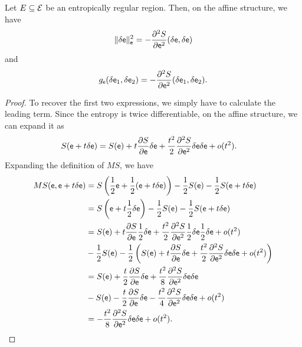\begin{mathSection}
\begin{thrm}
	Let $E \subseteq \mathcal{E}$ be an entropically regular region. Then, on the affine structure, we have
	$$ \lVert \delta \mathsf{e} \rVert_{\mathsf{e}}^2 = - \frac{\partial^2 S}{\partial \mathsf{e}^2}(\delta \mathsf{e} , \delta \mathsf{e}) $$
	and 
	$$ g_{\mathsf{e}}( \delta \mathsf{e}_1, \delta \mathsf{e}_2 ) = - \frac{\partial^2 S}{\partial \mathsf{e} ^2}( \delta \mathsf{e}_1, \delta \mathsf{e}_2 ).$$
\end{thrm}

\begin{proof}
	To recover the first two expressions, we simply have to calculate the leading term. Since the entropy is twice differentiable, on the affine structure, we can expand it as
	\begin{equation}
		\begin{aligned}
			S(\mathsf{e} + t \delta \mathsf{e}) &= S(\mathsf{e}) + t \frac{\partial S}{\partial \mathsf{e}} \delta \mathsf{e} + \frac{t^2}{2} \frac{\partial^2 S}{\partial \mathsf{e}^2} \delta \mathsf{e} \delta \mathsf{e} + o(t^2).
		\end{aligned}
	\end{equation}
	Expanding the definition of $MS$, we have
	\begin{equation}
		\begin{aligned}
			MS(\mathsf{e}, \mathsf{e} + t \delta \mathsf{e}) &= S\left(\frac{1}{2} \mathsf{e} + \frac{1}{2}(\mathsf{e} + t \delta \mathsf{e}) \right) - \frac{1}{2} S(\mathsf{e}) - \frac{1}{2} S(\mathsf{e}+t \delta \mathsf{e}) \\
			&=  S\left(\mathsf{e} + t \frac{1}{2} \delta \mathsf{e} \right) - \frac{1}{2} S(\mathsf{e}) - \frac{1}{2} S(\mathsf{e}+ t \delta \mathsf{e}) \\
			&= S(\mathsf{e}) + t \frac{\partial S}{\partial \mathsf{e}} \frac{1}{2}\delta \mathsf{e} + \frac{t^2}{2} \frac{\partial^2 S}{\partial \mathsf{e}^2} \frac{1}{2}\delta \mathsf{e} \frac{1}{2}\delta \mathsf{e} + o(t^2) \\
			&- \frac{1}{2} S(\mathsf{e}) - \frac{1}{2} \left( S(\mathsf{e}) + t \frac{\partial S}{\partial \mathsf{e}} \delta \mathsf{e} + \frac{t^2}{2} \frac{\partial^2 S}{\partial \mathsf{e}^2} \delta \mathsf{e} \delta \mathsf{e} + o(t^2) \right) \\
			&= S(\mathsf{e}) + \frac{t}{2} \frac{\partial S}{\partial \mathsf{e}} \delta \mathsf{e} + \frac{t^2}{8} \frac{\partial^2 S}{\partial \mathsf{e}^2} \delta \mathsf{e} \delta \mathsf{e} \\
			&- S(\mathsf{e}) - \frac{t}{2} \frac{\partial S}{\partial \mathsf{e}} \delta \mathsf{e} - \frac{t^2}{4} \frac{\partial^2 S}{\partial \mathsf{e}^2} \delta \mathsf{e} \delta \mathsf{e} + o(t^2) \\
			&= - \frac{t^2}{8} \frac{\partial^2 S}{\partial \mathsf{e}^2} \delta \mathsf{e} \delta \mathsf{e} + o(t^2).
		\end{aligned}
	\end{equation}
	

\end{proof}
\end{mathSection}
